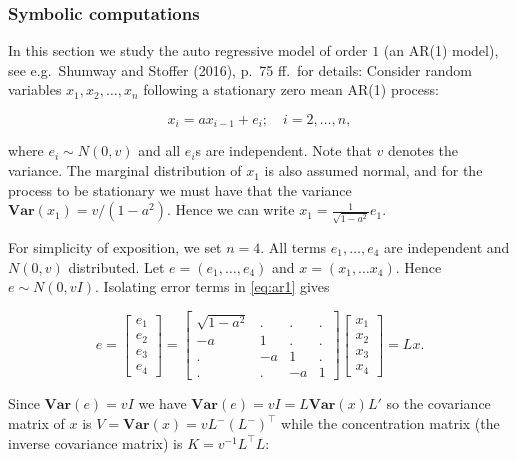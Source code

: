 \hypertarget{symbolic-computations}{%
\subsubsection{Symbolic computations}\label{symbolic-computations}}

In this section we study the auto regressive model of order \(1\) (an AR(1) model), see
e.g.~Shumway and Stoﬀer (2016), p.~75 ff.~for details:
Consider random variables \(x_1, x_2, \dots, x_n\) following a stationary zero mean AR(1) process:

\begin{equation}
  x_i = a x_{i-1} + e_i; \quad i=2, \dots, n,
  \label{eq:ar1}
\end{equation}

where \(e_i \sim N(0, v)\) and all \(e_i\)s are independent. Note that \(v\) denotes the variance.
The marginal distribution of \(x_1\) is also assumed normal, and for the process to be stationary
we must have that the variance \(\mathbf{Var}(x_1) = v / (1-a^2)\).
Hence we can write \(x_1 = \frac 1 {\sqrt{1-a^2}} e_1\).

For simplicity of exposition, we set \(n=4\). All terms \(e_1, \dots, e_4\) are independent and \(N(0, v)\) distributed. Let \(e=(e_1, \dots, e_4)\) and \(x=(x_1, \dots x_4)\). Hence \(e \sim N(0, v I)\). Isolating
error terms in \eqref{eq:ar1} gives

\[
  e= \left[\begin{matrix}e_{1}\\e_{2}\\e_{3}\\e_{4}\end{matrix}\right] = \left[\begin{matrix}\sqrt{1 - a^{2}} & . & . & .\\- a & 1 & . & .\\. & - a & 1 & .\\. & . & - a & 1\end{matrix}\right] \left[\begin{matrix}x_{1}\\x_{2}\\x_{3}\\x_{4}\end{matrix}\right] = L x  .
\]

Since
\(\mathbf{Var}(e)=v I\) we have \(\mathbf{Var}(e)=v I=L \mathbf{Var}(x) L'\) so the covariance matrix of \(x\) is \(V=\mathbf{Var}(x) = v L^- (L^-)^\top\) while the concentration matrix (the inverse covariance
matrix) is \(K=v^{-1}L^\top L\):

